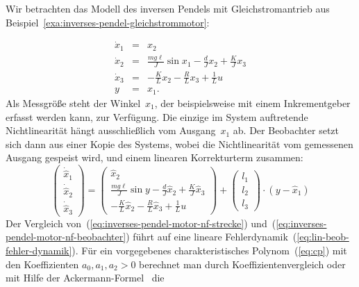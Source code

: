 \begin{example}
\label{exa:inverses-pendel-motor-nf-beobachter}Wir betrachten das
Modell des inversen Pendels mit Gleich\-strom\-antrieb aus Beispiel~\ref{exa:inverses-pendel-gleichstrommotor}:

\begin{equation}
\begin{array}{lcl}
\dot{x}_{1} & = & x_{2}\\
\dot{x}_{2} & = & \frac{mg\ell}{J}\sin x_{1}-\frac{d}{J}x_{2}+\frac{K}{J}x_{3}\\
\dot{x}_{3} & = & -\frac{K}{L}x_{2}-\frac{R}{L}x_{3}+\frac{1}{L}u\\
y & = & x_{1}.
\end{array}\label{eq:inverses-pendel-motor-nf-strecke}
\end{equation}
Als Messgröße steht der Winkel~$x_{1}$, der beispielsweise mit einem
Inkrementgeber erfasst werden kann, zur Verfügung. Die einzige im
System auftretende Nichtlinearität hängt ausschließlich vom Ausgang~$x_{1}$
ab. Der Beobachter setzt sich dann aus einer Kopie des Systems, wobei
die Nichtlinearität vom gemessenen Ausgang gespeist wird, und einem
linearen Korrekturterm zusammen: 
\begin{equation}
\left(\begin{array}{l}
\dot{\hat{x}}_{1}\\
\dot{\hat{x}}_{2}\\
\dot{\hat{x}}_{3}
\end{array}\right)=\left(\begin{array}{c}
\hat{x}_{2}\\
\frac{mg\ell}{J}\sin y-\frac{d}{J}\hat{x}_{2}+\frac{K}{J}\hat{x}_{3}\\
-\frac{K}{L}\hat{x}_{2}-\frac{R}{L}\hat{x}_{3}+\frac{1}{L}u
\end{array}\right)+\left(\begin{array}{l}
l_{1}\\
l_{2}\\
l_{3}
\end{array}\right)\cdot\left(y-\hat{x}_{1}\right)\label{eq:inverses-pendel-motor-nf-beobachter}
\end{equation}
Der Vergleich von~(\ref{eq:inverses-pendel-motor-nf-strecke}) und~(\ref{eq:inverses-pendel-motor-nf-beobachter})
führt auf eine lineare Fehlerdynamik~(\ref{eq:lin-beob-fehler-dynamik}).
Für ein vorgegebenes charakteristisches Polynom~(\ref{eq:cp}) mit
den Koeffizienten $a_{0},a_{1},a_{2}>0$ berechnet man durch Koeffizientenvergleich
oder mit Hilfe der Ackermann-Formel~\cite{acker77,ackermann77} die

\end{example}

